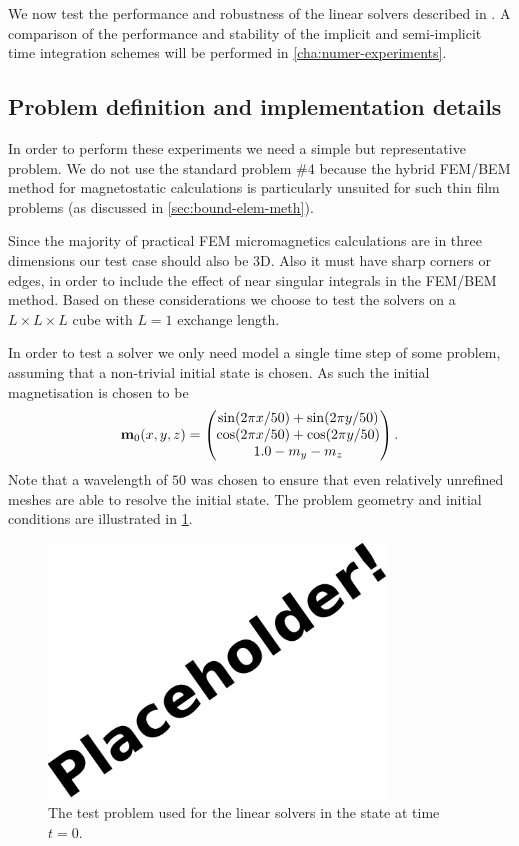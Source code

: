 We now test the performance and robustness of the linear solvers described in .
A comparison of the performance and stability of the implicit and semi-implicit time integration schemes will be performed in \cref{cha:numer-experiments}.


\subsection{Problem definition and implementation details}

In order to perform these experiments we need a simple but representative problem.
We do not use the \mumag standard problem \#4 because the hybrid FEM/BEM method for magnetostatic calculations is particularly unsuited for such thin film problems (as discussed in \cref{sec:bound-elem-meth}).

Since the majority of practical FEM micromagnetics calculations are in three dimensions our test case should also be 3D.
Also it must have sharp corners or edges, in order to include the effect of near singular integrals in the FEM/BEM method.
Based on these considerations we choose to test the solvers on a $L\times L \times L$ cube with $L=1$ exchange length.

In order to test a solver we only need model a single time step of some problem, assuming that a non-trivial initial state is chosen.
As such the initial magnetisation is chosen to be
\begin{equation}
  \boldsymbol{\mathrm{m}}_0(x, y, z) = \begin{pmatrix} \sin(2\pi x/50) + \sin(2\pi y/50) \\ \cos(2\pi x/50) + \cos(2 \pi y/50) \\ 1.0 - m_y - m_z \end{pmatrix}.
\end{equation}
Note that a wavelength of $50$ was chosen to ensure that even relatively unrefined meshes are able to resolve the initial state.
The problem geometry and initial conditions are illustrated in \cref{fig:cube-initial-condition}.

\begin{figure}
  \centering
  \includegraphics[width=0.8\textwidth]{images/placeholder}
  \caption{The test problem used for the linear solvers in the state at time $t=0$.}
  \label{fig:cube-initial-condition}
\end{figure}


